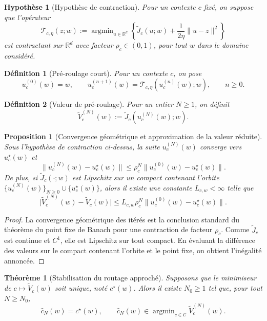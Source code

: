 \documentclass[11pt,a4paper]{article}
\newtheorem{definition}{Définition}[section]
\newtheorem{assumption}{Hypothèse}[section]
\newtheorem{proposition}{Proposition}[section]
\newtheorem{theorem}{Théorème}[section]
\DeclareMathOperator{\argmin}{argmin}
\newcommand{\R}{\mathbb R}
\newcommand{\Ccal}{\mathcal C}
\newcommand{\Tcal}{\mathcal T}
\begin{document}
\begin{assumption}[Hypothèse de contraction]
Pour un contexte \(c\) fixé, on suppose que l'opérateur
\[
\Tcal_{c,\eta}(z;w):=\argmin_{u\in\R^d}\left\{\widetilde J_c(u;w)+\frac{1}{2\eta}\|u-z\|^2\right\}
\]
est contractant sur \(\R^d\) avec facteur \(\rho_c\in(0,1)\), pour tout \(w\) dans le domaine considéré.
\end{assumption}

\begin{definition}[Pré-roulage court]
Pour un contexte \(c\), on pose
\[
u_c^{(0)}(w)=w,
\qquad
u_c^{(n+1)}(w)=\Tcal_{c,\eta}(u_c^{(n)}(w);w),
\qquad n\ge 0.
\]
\end{definition}

\begin{definition}[Valeur de pré-roulage]
Pour un entier \(N\ge 1\), on définit
\[
\widetilde V_c^{(N)}(w):=\widetilde J_c(u_c^{(N)}(w);w).
\]
\end{definition}

\begin{proposition}[Convergence géométrique et approximation de la valeur réduite]
Sous l'hypothèse de contraction ci-dessus, la suite \(u_c^{(N)}(w)\) converge vers \(u_c^\star(w)\) et
\[
\|u_c^{(N)}(w)-u_c^\star(w)\|\le \rho_c^N\|u_c^{(0)}(w)-u_c^\star(w)\|.
\]
De plus, si \(\widetilde J_c(\cdot;w)\) est Lipschitz sur un compact contenant l'orbite \(\{u_c^{(N)}(w)\}_{N\ge 0}\cup\{u_c^\star(w)\}\), alors il existe une constante \(L_{c,w}<\infty\) telle que
\[
\bigl|\widetilde V_c^{(N)}(w)-\widetilde V_c(w)\bigr|\le L_{c,w}\rho_c^N\|u_c^{(0)}(w)-u_c^\star(w)\|.
\]
\end{proposition}

\begin{proof}
La convergence géométrique des itérés est la conclusion standard du théorème du point fixe de Banach pour une contraction de facteur \(\rho_c\). Comme \(\widetilde J_c\) est continue et \(C^1\), elle est Lipschitz sur tout compact. En évaluant la différence des valeurs sur le compact contenant l'orbite et le point fixe, on obtient l'inégalité annoncée.
\end{proof}

\begin{theorem}[Stabilisation du routage approché]
Supposons que le minimiseur de \(c\mapsto \widetilde V_c(w)\) soit unique, noté \(c^\star(w)\). Alors il existe \(N_0\ge 1\) tel que, pour tout \(N\ge N_0\),
\[
\hat c_N(w)=c^\star(w),
\qquad
\hat c_N(w)\in\argmin_{c\in\Ccal}\widetilde V_c^{(N)}(w).
\]
\end{theorem}
\end{document}
